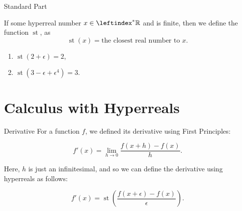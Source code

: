 \documentclass{beamer}
\DeclareMathOperator{\st}{st}
\newcommand{\ls}{\leftindex^*}
\newcommand{\RR}{\mathbb{R}}
\newcommand{\HR}{\ls{\RR}}
\begin{document}
\begin{frame}{Standard Part}
    \pause
    \begin{definition}
        If some hyperreal number \(x \in \HR\) and is finite, then we define the function \(\st\), as
        \[
            \st (x) = \text{the closest real number to \(x\)}.
        \]
    \end{definition}
    \pause

    \begin{examples}
        \begin{enumerate}
            \item
                  \(\st (2 + \epsilon) = 2\),
                  \pause
            \item
                  \(\st (3 - \epsilon + \epsilon^4) = 3\).
                  
        \end{enumerate}
    \end{examples}

\end{frame}

\section{Calculus with Hyperreals}

\begin{frame}{Derivative}
    For a function \(f\), we defined its derivative using First Principles:
    \begin{definition}
        \[
            f'(x) = \lim_{h \rightarrow 0} \frac{f(x+h) - f(x)}{h}.
        \]
    \end{definition}\pause

    Here, \(h\) is just an infinitesimal, and so we can define the derivative using hyperreals as follows:
    \begin{definition}
        \[
            f'(x) = \st\left(\frac{f(x + \epsilon) - f(x)}{\epsilon}\right).
        \]
    \end{definition}
\end{frame}
\end{document}
